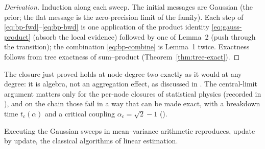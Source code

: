 \begin{proof}[Derivation]
Induction along each sweep. The initial messages are Gaussian (the
prior; the flat message is the zero-precision limit of the family). Each
step of \eqref{eq:bp-fwd}--\eqref{eq:bp-bwd} is one application of
the product identity \eqref{eq:gauss-product} (absorb the local evidence) followed
by one of Lemma~2 (push through the transition); the combination
\eqref{eq:bp-combine} is Lemma~1 twice. Exactness follows from tree
exactness of sum--product (Theorem~\ref{thm:tree-exact}).
\end{proof}

\begin{remark}
\label{rmk:bp-no-clt}
The closure just proved holds at node degree two exactly as it would at
any degree: it is algebra, not an aggregation effect, as discussed in
\compendium{}. The central-limit argument matters only
for the per-node closures of statistical physics
(recorded in \compendium{}), and on the chain those fail in a way that
can be made exact, with a breakdown time $t_c(\alpha)$ and a critical
coupling $\alpha_c = \sqrt{2} - 1$ (\compendium{}).
\end{remark}

Executing the Gaussian sweeps in mean--variance arithmetic reproduces,
update by update, the classical algorithms of linear estimation.

